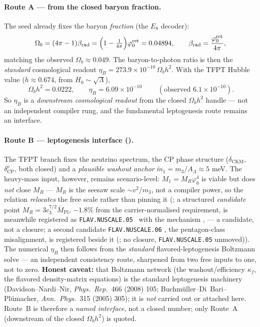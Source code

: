 \documentclass[11pt,a4paper]{article}
\newcommand{\phiz}{\varphi_0^{\mathrm{ret}}}
\begin{document}
\paragraph{Route A --- from the closed baryon fraction.} The seed already fixes the baryon
\emph{fraction} (the $E_8$ decoder):
\[
  \Omega_b=(4\pi-1)\beta_{\mathrm{rad}}=\Bigl(1-\tfrac1{4\pi}\Bigr)\phiz=0.04894 ,\qquad
  \beta_{\mathrm{rad}}=\frac{\phiz}{4\pi},
\]
matching the observed $\Omega_b\approx0.049$. The baryon-to-photon ratio is then the \emph{standard}
cosmological readout $\eta_B=273.9\times10^{-10}\,\Omega_b h^2$. With the TFPT Hubble value
($h\approx0.674$, from $H_0\sim\sqrt\Lambda$),
\[
  \boxed{\ \Omega_b h^2=0.0222,\qquad \eta_B=6.09\times10^{-10}\ }\qquad(\text{observed }6.1\times10^{-10}).
\]
So $\eta_B$ is a \emph{downstream cosmological readout} from the closed $\Omega_b h^2$ handle --- not an
independent compiler rung, and the fundamental leptogenesis route remains an interface.

\paragraph{Route B --- leptogenesis interface (\mC).} The TFPT branch fixes the neutrino
spectrum, the CP phase structure ($\delta_{\mathrm{CKM}}$, $\delta^\nu_{\mathrm{CP}}$, both closed) and a
\emph{plausible washout anchor} $\tilde m_1=m_3/A_\Lambda\approx5$ meV. The heavy-mass input, however,
remains scenario-level: $M_1=M_R\varphi_0^4$ is viable but does \emph{not} close $M_R$ --- $M_R$ is the
seesaw scale $\sim v^2/m_3$, not a compiler power, so the relation \emph{relocates} the free scale rather
than pinning it (; a structured \emph{candidate} point
$M_R=3c_3^{7/2}\bar M_{\mathrm{Pl}}$, $-1.8\%$ from the carrier-normalised requirement, is meanwhile registered as
\texttt{FLAV.NUSCALE.05} \mC\ with the mechanism \mO,  --- a candidate,
not a closure; a second candidate \texttt{FLAV.NUSCALE.06} \mC, the pentagon-class
misalignment, is registered beside it
(; no closure,
\texttt{FLAV.NUSCALE.05} unmoved)). The numerical $\eta_B$ then follows from the
\emph{standard} flavored-leptogenesis Boltzmann solve --- an independent consistency route, sharpened from
two free inputs to one, not to zero. \textbf{Honest caveat:} that Boltzmann network (the
washout/efficiency $\kappa_f$, the flavored density-matrix equations) is the standard leptogenesis
machinery (Davidson--Nardi--Nir, \emph{Phys.\ Rep.}\ 466 (2008) 105; Buchm\"uller--Di~Bari--Pl\"umacher,
\emph{Ann.\ Phys.}\ 315 (2005) 305); it is \emph{not} carried out or attached here. Route~B is therefore a
\emph{named interface}, not a closed number; only Route~A (downstream of the closed $\Omega_b h^2$) is
quoted.
\end{document}

